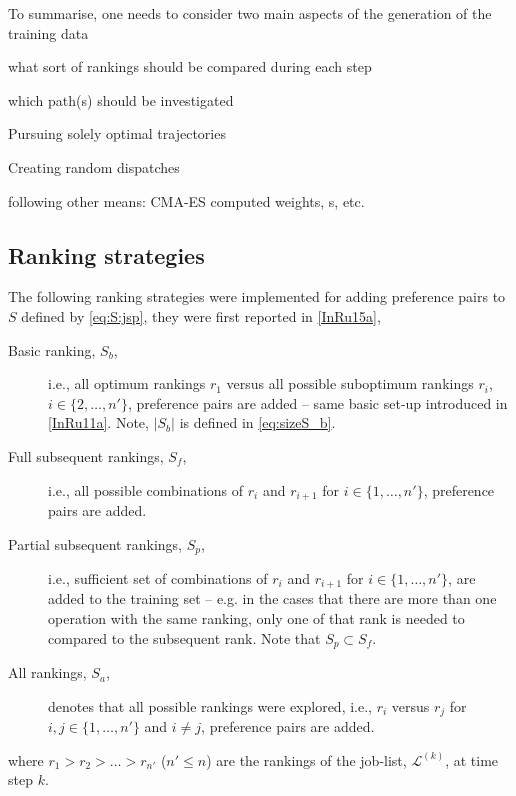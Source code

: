 To summarise, one needs to consider two main aspects of the generation of the 
training data
\begin{enumerate*}[label={\emph{\Roman*})},
        itemjoin={{? }}, itemjoin*={{? And }}, after={{}}]
    \item what sort of rankings should be compared during each step
    \item which path(s) should be investigated
    \begin{enumerate*}[label=\textit{\Roman{enumi}.\roman*)}, before={{? }},
        itemjoin={{? }}, itemjoin*={{? Or }}, after={{}}]
    \item Pursuing solely optimal trajectories
    \item Creating random dispatches
    \item following other means: CMA-ES computed weights, \sdr s, etc.
    \end{enumerate*}
\end{enumerate*}

\subsection{Ranking strategies}
The following ranking strategies were implemented for adding preference pairs 
to $S$ defined by \cref{eq:S:jsp}, they were first reported in \cref{InRu15a},
\begin{description}
	\item[Basic ranking, $S_b$,] i.e., all optimum rankings $r_1$ versus all 
	possible suboptimum rankings $r_i$, $i\in\{2,\ldots,n'\}$, preference pairs 
	are added -- same basic set-up introduced in \cref{InRu11a}. Note, $|S_b|$ 
	is defined in \cref{eq:sizeS_b}.
	\item[Full subsequent rankings, $S_f$,] i.e., all possible combinations of $r_i$ and $r_{i+1}$ for $i\in\{1,\ldots,n'\}$, preference pairs are added.
	\item[Partial subsequent rankings, $S_p$,] i.e., sufficient set of combinations of $r_i$ and $r_{i+1}$ for $i\in\{1,\ldots,n'\}$, are added to the training set -- e.g. in the cases that there are more than one operation with the same ranking, only one of that rank is needed to compared to the subsequent rank. Note that $S_p\subset S_f$.
	\item[All rankings, $S_a$,] denotes that all possible rankings were explored, i.e.,
	$r_i$ versus $r_j$ for $i,j\in\{1,\ldots,n'\}$ and $i\neq j$, preference pairs are added.
\end{description}
where $r_1>r_2>\ldots>r_{n'}$ ($n'\leq n$) are the rankings of the job-list, 
$\mathcal{L}^{(k)}$, at time step $k$.


